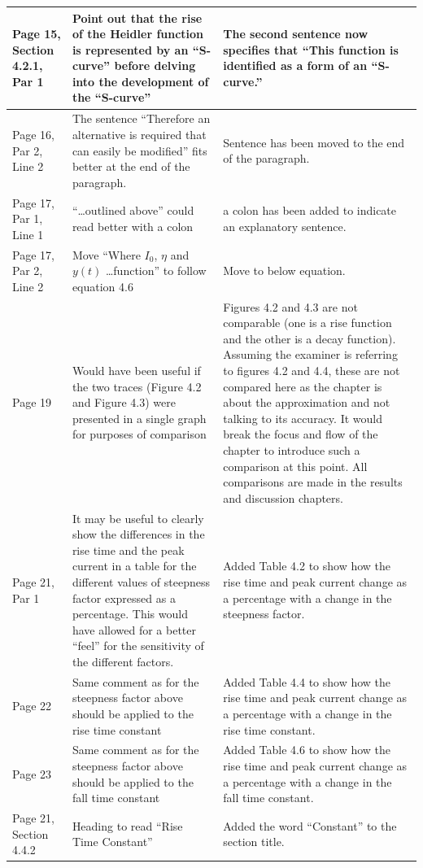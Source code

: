 \documentclass[11pt,a4paper]{letter} %
\begin{document}
\begin{tabularx}{6.5in}{X|p{}|p{}}
	Page 15, Section 4.2.1, Par 1 & Point out that the rise of the Heidler function is represented by an ``S-curve'' before delving into the development of the ``S-curve'' & The second sentence now specifies that ``This function is identified as a form of an ``S-curve.'' \\ \hline
	Page 16, Par 2, Line 2 & The sentence ``Therefore an alternative is required that can easily be modified'' fits better at the end of the paragraph. & Sentence has been moved to the end of the paragraph. \\ \hline
	Page 17, Par 1, Line 1 & ``\ldots outlined above'' could read better with a colon & a colon has been added to indicate an explanatory sentence. \\ \hline
	Page 17, Par 2, Line 2 & Move ``Where $I_0$, $\eta$ and $y(t)$ \ldots function'' to follow equation 4.6 & Move to below equation. \\ \hline
	Page 19 & Would have been useful if the two traces (Figure 4.2 and Figure 4.3) were presented in a single graph for purposes of comparison & Figures 4.2 and 4.3 are not comparable (one is a rise function and the other is a decay function). Assuming the examiner is referring to figures 4.2 and 4.4, these are not compared here as the chapter is about the approximation and not talking to its accuracy. It would break the focus and flow of the chapter to introduce such a comparison at this point. All comparisons are made in the results and discussion chapters. \\ \hline
	Page 21, Par 1 & It may be useful to clearly show the differences in the rise time and the peak current in a table for the different values of steepness factor expressed as a percentage. This would have allowed for a better ``feel'' for the sensitivity of the different factors. & Added Table 4.2 to show how the rise time and peak current change as a percentage with a change in the steepness factor. \\ \hline
	Page 22 & Same comment as for the steepness factor above should be applied to the rise time constant & Added Table 4.4 to show how the rise time and peak current change as a percentage with a change in the rise time constant. \\ \hline
	Page 23 & Same comment as for the steepness factor above should be applied to the fall time constant & Added Table 4.6 to show how the rise time and peak current change as a percentage with a change in the fall time constant. \\ \hline
	Page 21, Section 4.4.2 & Heading to read ``Rise Time Constant'' & Added the word ``Constant'' to the section title. \\ \hline

\end{tabularx}
\end{document}
